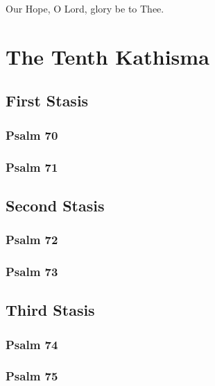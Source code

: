 \documentclass[12pt]{book}
\newcommand{\kathismabreak}{
  \medskip
  \begin{center}
  \begin{footnotesize}
  

  

  

  
  \end{footnotesize}
  \end{center}
  \smallbreak
}
\newcommand{\kathismaend}{
  \medskip
  \begin{center}
  \begin{footnotesize}
  

  

  Our Hope, O Lord, glory be to Thee.
  \end{footnotesize}
  \end{center}
  \smallbreak
}
\begin{document}
\kathismaend

\pagebreak %
\section{The Tenth Kathisma}

\subsection{First Stasis}

\subsubsection{Psalm 70}


\subsubsection{Psalm 71}


\kathismabreak

\pagebreak %
\subsection{Second Stasis}

\subsubsection{Psalm 72}


\subsubsection{Psalm 73}


\kathismabreak

\subsection{Third Stasis}

\subsubsection{Psalm 74}


\subsubsection{Psalm 75}

\end{document}
